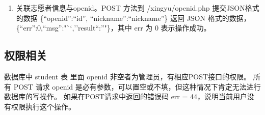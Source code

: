 \documentclass[]{article}
\providecommand{\tightlist}{%
  \setlength{\itemsep}{0pt}\setlength{\parskip}{0pt}}
\begin{document}
\begin{enumerate}
\def\labelenumi{\arabic{enumi}.}
\setcounter{enumi}{1}
\tightlist
\item
  关联志愿者信息与openid。POST 方法到 /xingyu/openid.php
  提交JSON格式的数据 \{``openid'':``id'', ``nickname'':``nickname''\}
  返回 JSON 格式的数据，\{``err'':0,``msg'':"``,''result``:''"\}，其中
  err 为 0 表示操作成功。
\end{enumerate}

\hypertarget{ux6743ux9650ux76f8ux5173}{%
\subsection{权限相关}\label{ux6743ux9650ux76f8ux5173}}

数据库中 student 表 里面 openid 非空者为管理员，有相应POST接口的权限。
所有 POST 请求 openid
是必有参数，可以置空或不填，但这种情况下肯定无法进行数据库的写操作。
如果在POST请求中返回的错误码 err =
44，说明当前用户没有权限执行这个操作。
\end{document}

